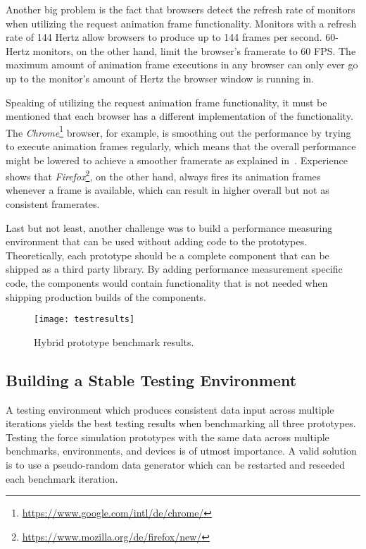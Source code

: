 Another big problem is the fact that browsers detect the refresh rate of monitors when utilizing the request animation frame functionality. Monitors with a refresh rate of 144 Hertz allow browsers to produce up to 144 frames per second. 60-Hertz monitors, on the other hand, limit the browser's framerate to 60 FPS. The maximum amount of animation frame executions in any browser can only ever go up to the monitor's amount of Hertz the browser window is running in. 

Speaking of utilizing the request animation frame functionality, it must be mentioned that each browser has a different implementation of the functionality. The \emph{Chrome}\footnote{\url{https://www.google.com/intl/de/chrome/}} browser, for example, is smoothing out the performance by trying to execute animation frames regularly, which means that the overall performance might be lowered to achieve a smoother framerate as explained in~\cite{ChromeRAF}. Experience shows that \emph{Firefox}\footnote{\url{https://www.mozilla.org/de/firefox/new/}}, on the other hand, always fires its animation frames whenever a frame is available, which can result in higher overall but not as consistent framerates.

Last but not least, another challenge was to build a performance measuring environment that can be used without adding code to the prototypes. Theoretically, each prototype should be a complete component that can be shipped as a third party library. By adding performance measurement specific code, the components would contain functionality that is not needed when shipping production builds of the components.

\begin{figure}
  \centering
  \texttt{[image: testresults]}
  \caption{Hybrid prototype benchmark results.}
  \label{fig:reactD3benchResult}
\end{figure}

\subsection{Building a Stable Testing Environment}
\label{sub:perfImplDetails}

A testing environment which produces consistent data input across multiple iterations yields the best testing results when benchmarking all three prototypes. Testing the force simulation prototypes with the same data across multiple benchmarks, environments, and devices is of utmost importance. A valid solution is to use a pseudo-random data generator which can be restarted and reseeded each benchmark iteration.

